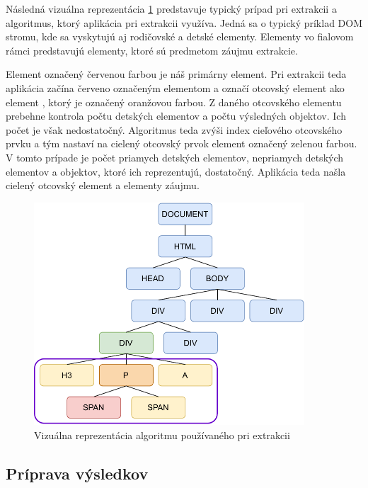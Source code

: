 \newpage

Následná vizuálna reprezentácia \ref{domvisual} predstavuje typický prípad pri extrakcii a algoritmus, ktorý aplikácia pri extrakcii využíva. Jedná sa o typický príklad DOM stromu, kde sa vyskytujú aj rodičovské a detské elementy. Elementy vo fialovom rámci predstavujú elementy, ktoré sú predmetom záujmu extrakcie. 

Element  označený červenou farbou je náš primárny element. Pri extrakcii teda aplikácia začína červeno označeným elementom  a označí otcovský element ako element , ktorý je označený oranžovou farbou. Z daného otcovského elementu prebehne kontrola počtu detských elementov a počtu výsledných objektov. Ich počet je však nedostatočný. Algoritmus teda zvýši index cieľového otcovského prvku a tým nastaví na cielený otcovský prvok element  označený zelenou farbou. V tomto prípade je počet priamych detských elementov, nepriamych detských elementov a objektov, ktoré ich reprezentujú, dostatočný. Aplikácia teda našla cielený otcovský element a elementy záujmu.

\bigskip

 \begin{figure}[hbt]
	\centering
	\includegraphics[width=0.9\textwidth]{obrazky-figures/dom.pdf}
	\caption{Vizuálna reprezentácia algoritmu používaného pri extrakcii}
	\label{domvisual}
\end{figure}

\newpage

\subsection{Príprava výsledkov}


